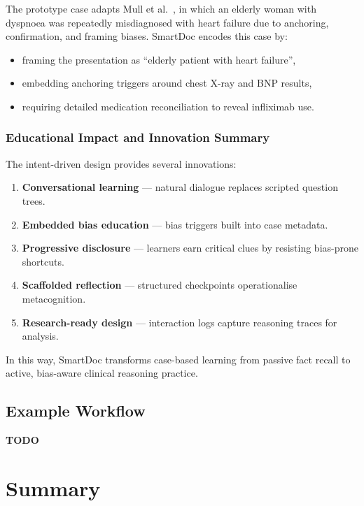 The prototype case adapts Mull et al.~\parencite{mull_cognitive_2015}, in which an
elderly woman with dyspnoea was repeatedly misdiagnosed with heart failure due to
anchoring, confirmation, and framing biases. SmartDoc encodes this case by:
\begin{itemize}
    \item framing the presentation as “elderly patient with heart failure”,
    \item embedding anchoring triggers around chest X-ray and BNP results,
    \item requiring detailed medication reconciliation to reveal infliximab use.
\end{itemize}

\subsubsection{Educational Impact and Innovation Summary}

The intent-driven design provides several innovations:

\begin{enumerate}
  \item \textbf{Conversational learning} — natural dialogue replaces scripted question trees.
  \item \textbf{Embedded bias education} — bias triggers built into case metadata.
  \item \textbf{Progressive disclosure} — learners earn critical clues by resisting bias-prone shortcuts.
  \item \textbf{Scaffolded reflection} — structured checkpoints operationalise metacognition.
  \item \textbf{Research-ready design} — interaction logs capture reasoning traces for analysis.
\end{enumerate}

In this way, SmartDoc transforms case-based learning from passive fact recall to active,
bias-aware clinical reasoning practice.

\subsection{Example Workflow}

\textbf{TODO}

\section{Summary}
\label{sec:summary}

